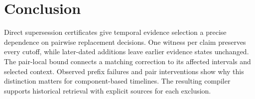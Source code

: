 \section{Conclusion}
\label{sec:conclusion}

Direct supersession certificates give temporal evidence selection a precise dependence on pairwise replacement decisions.
One witness per claim preserves every cutoff, while later-dated additions leave earlier evidence states unchanged.
The pair-local bound connects a matching correction to its affected intervals and selected context.
Observed prefix failures and pair interventions show why this distinction matters for component-based timelines.
The resulting compiler supports historical retrieval with explicit sources for each exclusion.
